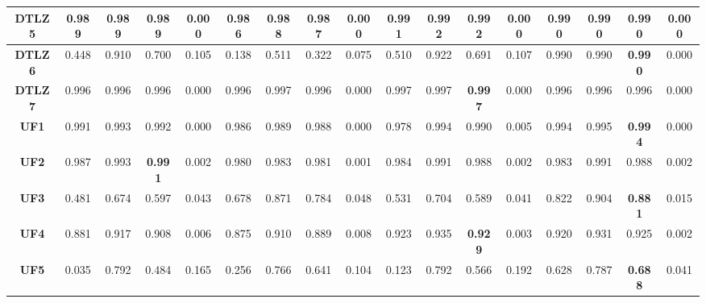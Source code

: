 \begin{table*}
\begin{tabular}{|c|c|c|c|c|c|c|c|c|c|c|c|c|c|c|c|c|}
\hline
\textbf{DTLZ5}        & 0.989           & 0.989           & 0.989           & 0.000           & 0.986           & 0.988           & 0.987           & 0.000           & 0.991           & 0.992           & \textbf{0.992 } & 0.000           & 0.990           & 0.990           & 0.990           & 0.000            \\ 
\hline
\textbf{DTLZ6}        & 0.448           & 0.910           & 0.700           & 0.105           & 0.138           & 0.511           & 0.322           & 0.075           & 0.510           & 0.922           & 0.691           & 0.107           & 0.990           & 0.990           & \textbf{0.990 } & 0.000            \\ 
\hline
\textbf{DTLZ7}        & 0.996           & 0.996           & 0.996           & 0.000           & 0.996           & 0.997           & 0.996           & 0.000           & 0.997           & 0.997           & \textbf{0.997 } & 0.000           & 0.996           & 0.996           & 0.996           & 0.000            \\ 
\hline
\textbf{UF1}          & 0.991           & 0.993           & 0.992           & 0.000           & 0.986           & 0.989           & 0.988           & 0.000           & 0.978           & 0.994           & 0.990           & 0.005           & 0.994           & 0.995           & \textbf{0.994 } & 0.000            \\ 
\hline
\textbf{UF2}          & 0.987           & 0.993           & \textbf{0.991 } & 0.002           & 0.980           & 0.983           & 0.981           & 0.001           & 0.984           & 0.991           & 0.988           & 0.002           & 0.983           & 0.991           & 0.988           & 0.002            \\ 
\hline
\textbf{UF3}          & 0.481           & 0.674           & 0.597           & 0.043           & 0.678           & 0.871           & 0.784           & 0.048           & 0.531           & 0.704           & 0.589           & 0.041           & 0.822           & 0.904           & \textbf{0.881 } & 0.015            \\ 
\hline
\textbf{UF4}          & 0.881           & 0.917           & 0.908           & 0.006           & 0.875           & 0.910           & 0.889           & 0.008           & 0.923           & 0.935           & \textbf{0.929 } & 0.003           & 0.920           & 0.931           & 0.925           & 0.002            \\ 
\hline
\textbf{UF5}          & 0.035           & 0.792           & 0.484           & 0.165           & 0.256           & 0.766           & 0.641           & 0.104           & 0.123           & 0.792           & 0.566           & 0.192           & 0.628           & 0.787           & \textbf{0.688 } & 0.041            \\ 

\end{tabular}
\end{table*}
